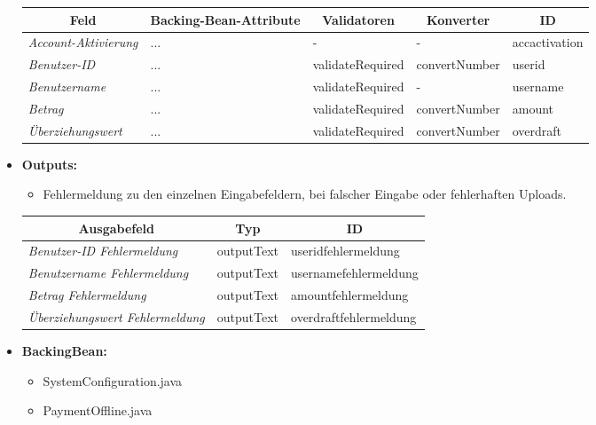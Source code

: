 \begin{itemize}
\begin{center}
\begin{longtable}{|p{3cm} |p{4cm} | p{4cm}|p{3cm} |p{2cm}|}
						\hline \multicolumn{1}{|c|}{\textbf{Feld}} & \multicolumn{1}{|c|}{\textbf{Backing-Bean-Attribute}} & \multicolumn{1}{|c|}{\textbf{Validatoren}}  &  \multicolumn{1}{|c|}{\textbf{Konverter}} &  \multicolumn{1}{|c|}{\textbf{ID}} \\ \hline
						\endfirsthead
						\hline
						\endlastfoot
						\textit{Account-Aktivierung} & ... & - & - & accactivation\\ \hline
						\textit{Benutzer-ID} & ... & validateRequired & convertNumber & userid\\ \hline
						\textit{Benutzername} & ... & validateRequired & - & username\\ \hline
						\textit{Betrag} & ... & validateRequired & convertNumber & amount \\ \hline
						\textit{Überziehungswert} & ... & validateRequired & convertNumber & overdraft\\ \hline
					\end{longtable}
				\end{center}
			\item \textbf{Outputs:}
			\begin{itemize}
				\item Fehlermeldung zu den einzelnen Eingabefeldern, bei falscher Eingabe oder fehlerhaften Uploads.
			\end{itemize}

					\begin{center}
						\begin{longtable}{|p{5cm} | p{3cm}|p{5cm}|}
							
							\hline \multicolumn{1}{|c|}{\textbf{Ausgabefeld}} & \multicolumn{1}{|c|}{\textbf{Typ}}  &  \multicolumn{1}{|c|}{\textbf{ID}} \\ \hline
							\endfirsthead
							\hline
							\endlastfoot
							\textit{Benutzer-ID Fehlermeldung}  & outputText & useridfehlermeldung \\ \hline
							\textit{Benutzername Fehlermeldung}  & outputText & usernamefehlermeldung \\ \hline
							\textit{Betrag Fehlermeldung} & outputText & amountfehlermeldung\\ \hline
							\textit{Überziehungswert Fehlermeldung} & outputText & overdraftfehlermeldung\\ \hline
						\end{longtable}
					\end{center}
			\item \textbf{BackingBean:}
			\begin{itemize}
				\item SystemConfiguration.java
				\item PaymentOffline.java
			\end{itemize}
		\end{itemize}
		
